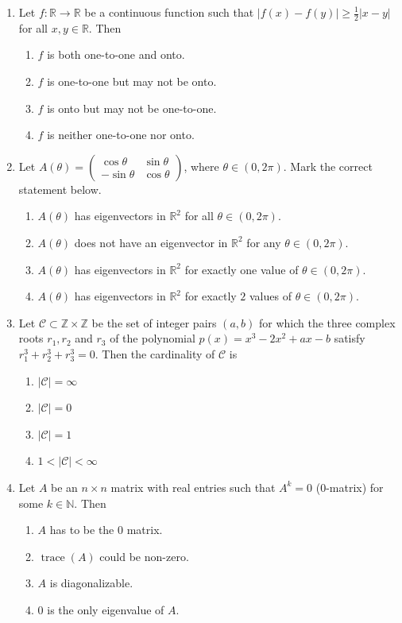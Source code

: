 \documentclass[11pt, a4paper]{article}
\begin{document}
\begin{enumerate}
  \item Let $f: \mathbb{R} \to \mathbb{R}$ be a continuous function such that $|f(x) - f(y)| \ge \frac{1}{2}|x - y|$ for all $x, y \in \mathbb{R}$. Then
  \begin{enumerate}[label=\Alph*.]
    \item $f$ is both one-to-one and onto.
    \item $f$ is one-to-one but may not be onto.
    \item $f$ is onto but may not be one-to-one.
    \item $f$ is neither one-to-one nor onto.
  \end{enumerate}

  \item Let $A(\theta) = \begin{pmatrix} \cos\theta & \sin\theta \\ -\sin\theta & \cos\theta \end{pmatrix}$, where $\theta \in (0, 2\pi)$. Mark the correct statement below.
  \begin{enumerate}[label=\Alph*.]
    \item $A(\theta)$ has eigenvectors in $\mathbb{R}^2$ for all $\theta \in (0, 2\pi)$.
    \item $A(\theta)$ does not have an eigenvector in $\mathbb{R}^2$ for any $\theta \in (0, 2\pi)$.
    \item $A(\theta)$ has eigenvectors in $\mathbb{R}^2$ for exactly one value of $\theta \in (0, 2\pi)$.
    \item $A(\theta)$ has eigenvectors in $\mathbb{R}^2$ for exactly $2$ values of $\theta \in (0, 2\pi)$.
  \end{enumerate}

  \item Let $\mathcal{C} \subset \mathbb{Z} \times \mathbb{Z}$ be the set of integer pairs $(a, b)$ for which the three complex roots $r_1, r_2$ and $r_3$ of the polynomial $p(x) = x^3 - 2x^2 + ax - b$ satisfy $r_1^3 + r_2^3 + r_3^3 = 0$. Then the cardinality of $\mathcal{C}$ is
  \begin{enumerate}[label=\Alph*.]
    \item $|\mathcal{C}| = \infty$
    \item $|\mathcal{C}| = 0$
    \item $|\mathcal{C}| = 1$
    \item $1 < |\mathcal{C}| < \infty$
  \end{enumerate}

  \item Let $A$ be an $n \times n$ matrix with real entries such that $A^k = 0$ ($0$-matrix) for some $k \in \mathbb{N}$. Then
  \begin{enumerate}[label=\Alph*.]
    \item $A$ has to be the $0$ matrix.
    \item $\operatorname{trace}(A)$ could be non-zero.
    \item $A$ is diagonalizable.
    \item $0$ is the only eigenvalue of $A$.
  \end{enumerate}


\end{enumerate}
\end{document}
